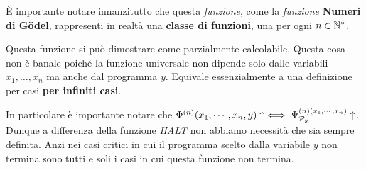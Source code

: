 È importante notare innanzitutto che questa \textit{funzione}, come la \textit{funzione} \textbf{Numeri di Gödel}, rappresenti in realtà una \textbf{classe di funzioni}, una per ogni \(n\in\mathbb{N}^*\).

Questa funzione si può dimostrare come parzialmente calcolabile. Questa cosa non è banale poiché la funzione universale non dipende solo dalle variabili \(x_1, \dots, x_n\) ma anche dal programma \(y\).
Equivale essenzialmente a una definizione per casi \textbf{per infiniti casi}.

In particolare è importante notare che \(\Phi^{(n)}(x_1,\cdots,x_n,y) \uparrow \iff \Psi_{\mathcal{P}_y}^{(n)(x_1,\cdots, x_n)} \uparrow\). Dunque a differenza della funzione \textit{HALT} non abbiamo necessità che sia sempre definita. Anzi nei casi critici in cui il programma scelto dalla variabile \(y\) non termina sono tutti e soli i casi in cui questa funzione non termina.

